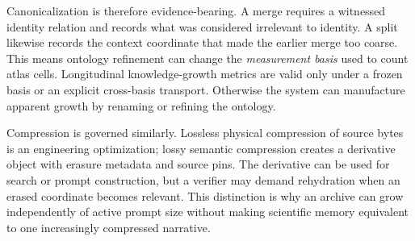 Canonicalization is therefore evidence-bearing. A merge requires a witnessed identity relation and records what was considered irrelevant to identity. A split likewise records the context coordinate that made the earlier merge too coarse. This means ontology refinement can change the \emph{measurement basis} used to count atlas cells. Longitudinal knowledge-growth metrics are valid only under a frozen basis or an explicit cross-basis transport. Otherwise the system can manufacture apparent growth by renaming or refining the ontology.

Compression is governed similarly. Lossless physical compression of source bytes is an engineering optimization; lossy semantic compression creates a derivative object with erasure metadata and source pins. The derivative can be used for search or prompt construction, but a verifier may demand rehydration when an erased coordinate becomes relevant. This distinction is why an archive can grow independently of active prompt size without making scientific memory equivalent to one increasingly compressed narrative.
